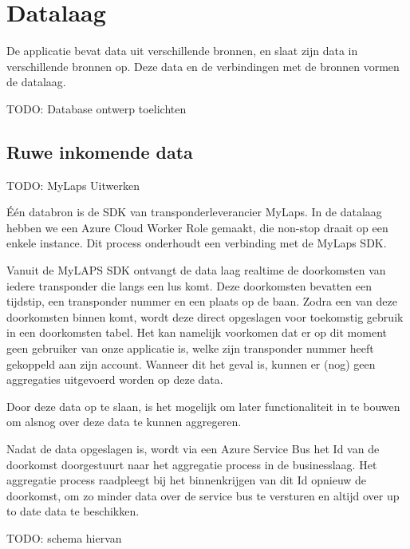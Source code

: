 \section{Datalaag}
De applicatie bevat data uit verschillende bronnen, en slaat zijn data in verschillende bronnen op. Deze data en de verbindingen met de bronnen vormen de datalaag.

{\par \bigskip \par \color{red} TODO: Database ontwerp toelichten \par \bigskip \par }

\subsection{Ruwe inkomende data}

{\par \bigskip \par \color{red} TODO: MyLaps Uitwerken \par \bigskip \par }

Één databron is de SDK van transponderleverancier MyLaps. In de datalaag hebben we een Azure Cloud Worker Role gemaakt, die non-stop draait op een enkele instance. Dit process onderhoudt een verbinding met de MyLaps SDK.

Vanuit de MyLAPS SDK ontvangt de data laag realtime de doorkomsten van iedere transponder die langs een lus komt. Deze doorkomsten bevatten een tijdstip, een transponder nummer en een plaats op de baan. Zodra een van deze doorkomsten binnen komt, wordt deze direct opgeslagen voor toekomstig gebruik in een doorkomsten tabel. Het kan namelijk voorkomen dat er op dit moment geen gebruiker van onze applicatie is, welke zijn transponder nummer heeft gekoppeld aan zijn account. Wanneer dit het geval is, kunnen er (nog) geen aggregaties uitgevoerd worden op deze data.

Door deze data op te slaan, is het mogelijk om later functionaliteit in te bouwen om alsnog over deze data te kunnen aggregeren.

Nadat de data opgeslagen is, wordt via een Azure Service Bus het Id van de doorkomst doorgestuurt naar het aggregatie process in de businesslaag. Het aggregatie process raadpleegt bij het binnenkrijgen van dit Id opnieuw de doorkomst, om zo minder data over de service bus te versturen en altijd over up to date data te beschikken.

TODO: schema hiervan

